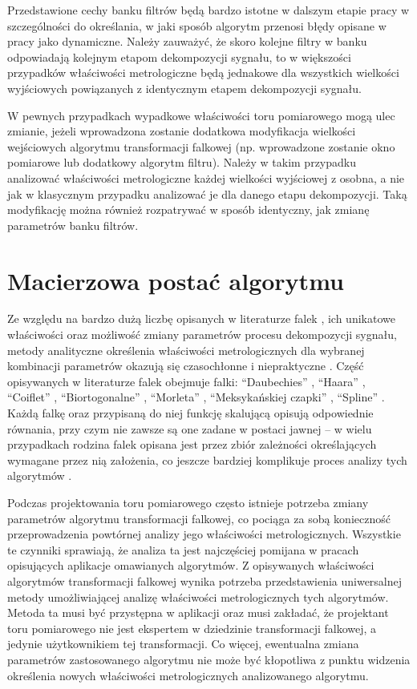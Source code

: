 Przedstawione cechy banku filtrów będą bardzo istotne w dalszym etapie pracy w szczególności do określania, w jaki sposób algorytm przenosi błędy opisane w pracy jako dynamiczne. Należy zauważyć, że skoro kolejne filtry w banku odpowiadają kolejnym etapom dekompozycji sygnału, to w większości przypadków właściwości metrologiczne będą jednakowe dla wszystkich wielkości wyjściowych powiązanych z identycznym etapem dekompozycji sygnału.

W pewnych przypadkach wypadkowe właściwości toru pomiarowego mogą ulec zmianie, jeżeli wprowadzona zostanie dodatkowa modyfikacja wielkości wejściowych algorytmu transformacji falkowej (np. wprowadzone zostanie okno pomiarowe lub dodatkowy algorytm filtru). Należy w takim przypadku analizować właściwości metrologiczne każdej wielkości wyjściowej z osobna, a nie jak w klasycznym przypadku analizować je dla danego etapu dekompozycji. Taką modyfikację można również rozpatrywać w sposób identyczny, jak zmianę parametrów banku filtrów.

\section{Macierzowa postać algorytmu}

Ze względu na bardzo dużą liczbę opisanych w literaturze falek \cite{akujuobi_applications}, ich unikatowe właściwości oraz możliwość zmiany parametrów procesu dekompozycji sygnału, metody analityczne określenia właściwości metrologicznych dla wybranej kombinacji parametrów okazują się czasochłonne i niepraktyczne \cite{yan_uncertainty, wilczok_uncertainty, peretto_uncertainty, sarrafi_uncertainty}. Część opisywanych w literaturze falek obejmuje falki: \enquote{Daubechies} \cite{vonesch_dbbasics}, \enquote{Haara} \cite{stankovic_haar}, \enquote{Coiflet} \cite{wei_coiflet}, \enquote{Biortogonalne} \cite{sweldens_bior}, \enquote{Morleta} \cite{cohen_morlet}, \enquote{Meksykańskiej czapki} \cite{singh_mexican}, \enquote{Spline} \cite{averbuch_spline, wang_splinebasics}. Każdą falkę oraz przypisaną do niej funkcję skalującą opisują odpowiednie równania, przy czym nie zawsze są one zadane w postaci jawnej -- w wielu przypadkach rodzina falek opisana jest przez zbiór zależności określających wymagane przez nią założenia, co jeszcze bardziej komplikuje proces analizy tych algorytmów \cite{rowe_dbmath}.

Podczas projektowania toru pomiarowego często istnieje potrzeba zmiany parametrów algorytmu transformacji falkowej, co pociąga za sobą konieczność przeprowadzenia powtórnej analizy jego właściwości metrologicznych. Wszystkie te czynniki sprawiają, że analiza ta jest najczęściej pomijana w pracach opisujących aplikacje omawianych algorytmów. Z opisywanych właściwości algorytmów transformacji falkowej wynika potrzeba przedstawienia uniwersalnej metody umożliwiającej analizę właściwości metrologicznych tych algorytmów. Metoda ta musi być przystępna w aplikacji oraz musi zakładać, że projektant toru pomiarowego nie jest ekspertem w dziedzinie transformacji falkowej, a jedynie użytkownikiem tej transformacji. Co więcej, ewentualna zmiana parametrów zastosowanego algorytmu nie może być kłopotliwa z punktu widzenia określenia nowych właściwości metrologicznych analizowanego algorytmu.

